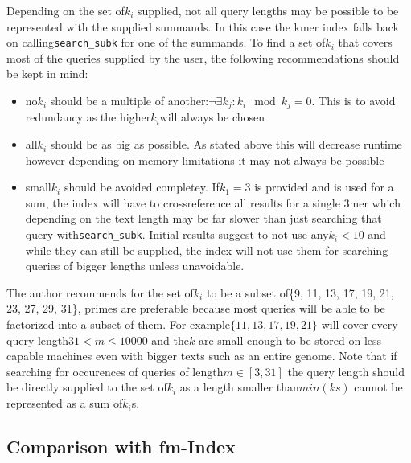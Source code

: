 Depending on the set of$k_{i}$ supplied, not all query lengths may
be possible to be represented with the supplied summands. In this
case the kmer index falls back on calling\lstinline{search_subk}
for one of the summands. To find a set of$k_{i}$ that covers most
of the queries supplied by the user, the following recommendations
should be kept in mind:
\begin{itemize}
\item no$k_{i}$ should be a multiple of another:$\lnot\exists k_{j}:k_{i}\mod k_{j}=0$.
This is to avoid redundancy as the higher$k_{i}$will always be chosen
\item all$k_{i}$ should be as big as possible. As stated above this will
decrease runtime however depending on memory limitations it may not
always be possible
\item small$k_{i}$ should be avoided completey. If$k_{1}=3$ is provided
and is used for a sum, the index will have to crossreference all results
for a single 3mer which depending on the text length may be far slower
than just searching that query with\lstinline{search_subk}. Initial
results suggest to not use any$k_{i}<10$ and while they can still
be supplied, the index will not use them for searching queries of
bigger lengths unless unavoidable.
\end{itemize}
The author recommends for the set of$k_{i}$ to be a subset of\{9,
11, 13, 17, 19, 21, 23, 27, 29, 31\}, primes are preferable because
most queries will be able to be factorized into a subset of them.
For example$\{11,13,17,19,21\}$ will cover every query length$31<m\leq10000$
and the$k$ are small enough to be stored on less capable machines
even with bigger texts such as an entire genome. Note that if searching
for occurences of queries of length$m\in[3,31]$ the query length
should be directly supplied to the set of$k_{i}$ as a length smaller
than$min(ks)$ cannot be represented as a sum of$k_{i}$s.

\subsection{Comparison with fm-Index}

